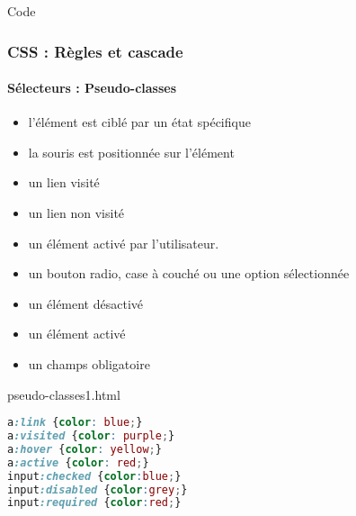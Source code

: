 \documentclass[xcolor=table]{beamer}
\begin{document}
\begin{frame}[fragile]{Code}
\frametitle{CSS : Règles et cascade}
\framesubtitle{Sélecteurs : Pseudo-classes}

\begin{minipage}{0.60\textwidth} 
	\begin{itemize}
		\item l'élément est ciblé par un état spécifique
		\item {} la souris est positionnée sur l'élément
		\item {} un lien visité
		\item {} un lien non visité
		\item {} un élément activé par l'utilisateur.
		\item {} un bouton radio, case à couché ou une option sélectionnée
		\item {} un élément désactivé
		\item {} un élément activé
		\item {} un champs obligatoire
	\end{itemize}
\end{minipage}
%
\begin{minipage}{0.38\textwidth}
\begin{exampleblock}{pseudo-classes1.html}
\scriptsize\bfseries
\begin{lstlisting}[language={CSS}]
a:link {color: blue;}
a:visited {color: purple;}
a:hover {color: yellow;}
a:active {color: red;}
input:checked {color:blue;}
input:disabled {color:grey;}
input:required {color:red;}
\end{lstlisting}
\end{exampleblock}
\end{minipage}

\end{frame}
\end{document}
